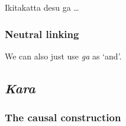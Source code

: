 \documentclass[UTF8, a4paper, oneside, scheme=plain]{ctexrep}
\newcommand{\corpus}[1]{\emph{#1}}
\newcommand{\translate}[1]{`#1'}
\begin{document}
\begin{exe}
    \ex Ikitakatta desu ga \dots
\end{exe}

\subsubsection{Neutral linking}

We can also just use \corpus{ga} as \translate{and}.

\subsection{\corpus{Kara}}

\subsubsection{The causal construction}



\end{document}
